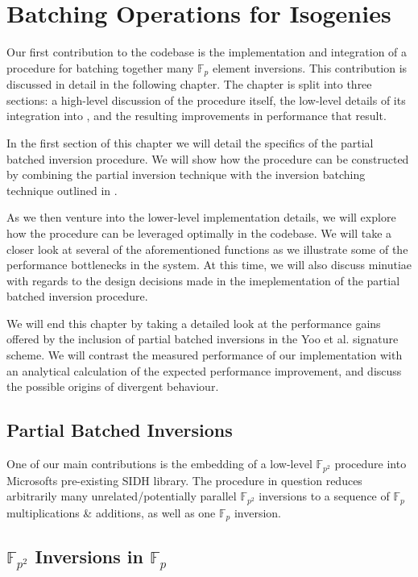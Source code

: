 \chapter{Batching Operations for Isogenies}

Our first contribution to the \sidh codebase is the implementation and integration of a procedure for batching together many $\mathbb{F}_{p}$ element inversions. This contribution is discussed in detail in the following chapter. The chapter is split into three sections: a high-level discussion of the procedure itself, the low-level details of its integration into \sidh, and the resulting improvements in performance that result. 

In the first section of this chapter we will detail the specifics of the partial batched inversion procedure. We will show how the procedure can be constructed by combining the partial inversion technique with the inversion batching technique outlined in \cite{batching}. 

As we then venture into the lower-level implementation details, we will explore how the procedure can be leveraged optimally in the codebase. We will take a closer look at several of the aforementioned \sidh functions as we illustrate some of the performance bottlenecks in the system. At this time, we will also discuss minutiae with regards to the design decisions made in the imeplementation of the partial batched inversion procedure.

We will end this chapter by taking a detailed look at the performance gains offered by the inclusion of partial batched inversions in the Yoo et al. signature scheme. We will contrast the measured performance of our implementation with an analytical calculation of the expected performance improvement, and discuss the possible origins of divergent behaviour.  

\section{Partial Batched Inversions}

One of our main contributions is the embedding of a low-level $\mathbb{F}_{p^{2}}$ procedure into Microsofts pre-existing SIDH library. The procedure in question reduces arbitrarily many unrelated/potentially parallel $\mathbb{F}_{p^{2}}$ inversions to a sequence of $\mathbb{F}_{p}$ multiplications \& additions, as well as one $\mathbb{F}_{p}$ inversion.\\

\section{$\mathbb{F}_{p^{2}}$ Inversions in $\mathbb{F}_{p}$}

